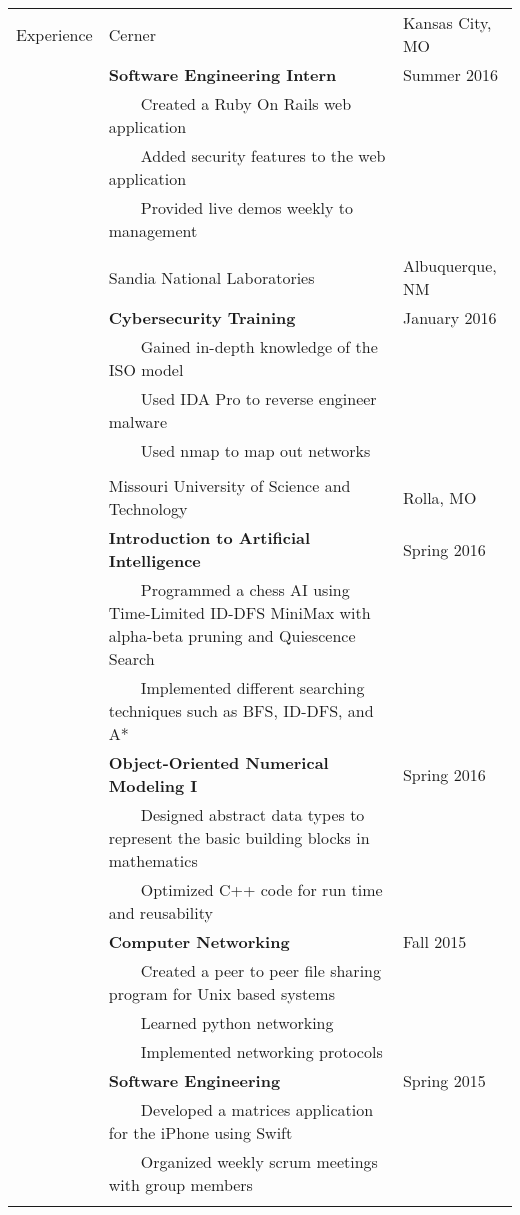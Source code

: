 \documentclass[10.5pt, arial]{article}
\newcommand{\tabitem}{~~\llap{\textbullet}~~}
\begin{document}
\begin{tabular}{p{1.5cm} p{12.9cm} l}
Experience  & Cerner 															& Kansas City, MO 		\\
			& \textbf{Software Engineering Intern} 								& Summer 2016			\\
			& \tabitem Created a Ruby On Rails web application 					& 						\\
			& \tabitem Added security features to the web application			& 						\\
			& \tabitem Provided live demos weekly to management 					& 						\\ \\

			& Sandia National Laboratories										& Albuquerque, NM 		\\
			& \textbf{Cybersecurity Training} 									& January 2016 			\\
			& \tabitem Gained in-depth knowledge of the ISO model 				& 						\\
			& \tabitem Used IDA Pro to reverse engineer malware 				& 						\\
			& \tabitem Used nmap to map out networks 							& 						\\ \\

			& Missouri University of Science and Technology						& Rolla, MO 			\\
			& \textbf{Introduction to Artificial Intelligence} 					& Spring 2016 			\\
			& \tabitem Programmed a chess AI using Time-Limited ID-DFS MiniMax with alpha-beta pruning and Quiescence Search	& \\
			& \tabitem Implemented different searching techniques such as BFS, ID-DFS, and A* 	& 		\\

			& \textbf{Object-Oriented Numerical Modeling I} 					& Spring 2016 			\\
			& \tabitem Designed abstract data types to represent the basic building blocks in mathematics & \\
			& \tabitem Optimized C++ code for run time and reusability 		& 						\\

			& \textbf{Computer Networking} 										& Fall 2015 			\\
			& \tabitem Created a peer to peer file sharing program for Unix based systems 		& 		\\
			& \tabitem Learned python networking 								& 						\\
			& \tabitem Implemented networking protocols 						& 						\\

			& \textbf{Software Engineering} 									& Spring 2015 			\\
			& \tabitem Developed a matrices application for the iPhone using Swift& 						\\
			& \tabitem Organized weekly scrum meetings with group members 		& 						\\ \\


\end{tabular}
\end{document}
